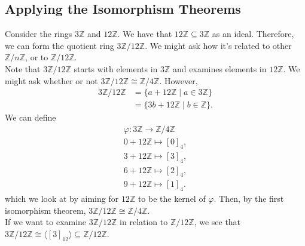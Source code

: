 \documentclass[8pt]{extarticle}
\newcommand{\Z}{\mathbb{Z}}
\begin{document}
  \subsection{Applying the Isomorphism Theorems}%
  Consider the rings $3\Z$ and $12\Z$. We have that $12\Z \subseteq 3\Z$ as an ideal. Therefore, we can form the quotient ring $3\Z/12\Z$. We might ask how it's related to other $\Z/n\Z$, or to $\Z/12\Z$.\\

  Note that $3\Z/12\Z$ starts with elements in $3\Z$ and examines elements in $12\Z$. We might ask whether or not $3\Z/12\Z \cong \Z/4\Z$. However,
  \begin{align*}
    3\Z/12\Z &= \{a + 12\Z\mid a\in 3\Z\}\\
             &= \{3b + 12\Z \mid b\in\Z\}.
  \end{align*}
  We can define 
  \begin{align*}
    \varphi: 3\Z\rightarrow \Z/4\Z\\
    0 + 12\Z \mapsto [0]_4,\\
    3 + 12\Z \mapsto [3]_4,\\
    6 + 12\Z \mapsto [2]_4,\\
    9 + 12\Z \mapsto [1]_4.
  \end{align*}
  which we look at by aiming for $12\Z$ to be the kernel of $\varphi$. Then, by the first isomorphism theorem, $3\Z/12\Z \cong \Z/4\Z$.\\

  If we want to examine $3\Z/12\Z$ in relation to $\Z/12\Z$, we see that $3\Z/12\Z \cong \langle[3]_{12}\rangle \subseteq \Z/12\Z$.
\end{document}
